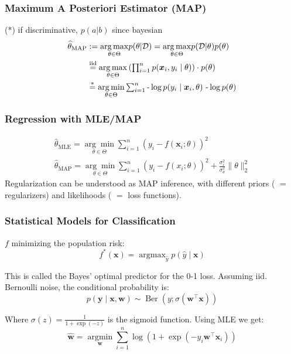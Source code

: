 \documentclass[a4paper,11pt]{article}
\begin{document}
\subsubsection*{Maximum A Posteriori Estimator (MAP)}
(*) if discriminative, $p(a|b)$ since bayesian
$$
\begin{aligned}
\widehat{\theta}_{\text{MAP}} &\mathrlap{{}\textstyle:=\underset{\theta \in \Theta}{\arg \max } p(\theta| \mathcal{D}) = \underset{\theta \in \Theta}{\arg \max } p(\mathcal{D} | \theta) p(\theta)} \\
&\textstyle \stackrel{\text{iid}}{=} \underset{\theta \in \Theta}{\arg \max }\left(\prod_{i=1}^n p(\boldsymbol{x}_i, y_i \mid \theta)\right) \cdot p(\theta) \\
&\textstyle \stackrel{*}{=}\underset{\theta \in \Theta}{\arg \min } \sum_{i=1}^n \text{-}\log p(y_i \mid \boldsymbol{x}_i, \theta) \text{ -}\log p(\theta)
\end{aligned}
$$

\subsubsection*{Regression with MLE/MAP}

\begin{gather*}
	\textstyle \widehat{\theta}_\text{MLE}=\underset{\theta \in \Theta}{\arg \min } \sum_{i=1}^n\left(y_i-f\left(\boldsymbol{x}_i ; \theta\right)\right)^2\\
	\textstyle \widehat{\theta}_\text{MAP}=\underset{\theta \in \Theta}{\arg \min } \sum_{i=1}^n\left(y_i-f\left(x_i ; \theta\right)\right)^2+\frac{\sigma_{\varepsilon}^2}{\sigma_\theta^2}\|\theta\|_2^2	
\end{gather*}
Regularization can be understood as MAP inference, with different priors ( $=$ regularizers) and likelihoods ( $=$ loss functions).
\subsubsection*{Statistical Models for Classification}
$f$ minimizing the population risk:
$$
f^*(\mathbf{x})=\operatorname{argmax}_{\hat{y}} p(\hat{y} \mid \mathbf{x})
$$

This is called the Bayes' optimal predictor for the 0-1 loss. Assuming iid. Bernoulli noise, the conditional probability is:
$$
p(\mathbf{y} \mid \mathbf{x}, \mathbf{w}) \sim \operatorname{Ber}\left(y ; \sigma\left(\mathbf{w}^{\top} \mathbf{x}\right)\right)
$$

Where $\sigma(z)=\frac{1}{1+\exp (-z)}$ is the sigmoid function. Using MLE we get:
$$
\textstyle \hat{\mathbf{w}}=\underset{\mathbf{w}}{\operatorname{argmin}} \sum_{i=1}^n \log \left(1+\exp \left(-y_i \mathbf{w}^{\top} \mathbf{x}_i\right)\right)
$$
\end{document}
